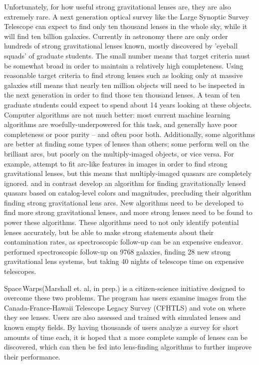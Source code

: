 \documentclass[10pt,twocolumn,letterpaper]{article}
\begin{document}
Unfortunately, for how useful strong gravitational lenses are, they are also
extremely rare. A next generation optical survey like the Large Synoptic Survey
Telescope can expect to find only ten thousand lenses in the whole sky, while
it will find ten billion galaxies. Currently in astronomy there are only order
hundreds of strong gravitational lenses known, mostly discovered by 'eyeball
squads' of graduate students. The small number means that target criteria must
be somewhat broad in order to maintain a relatively high completeness. Using
reasonable target criteria to find strong lenses such as looking only at
massive galaxies still means that nearly ten million objects will need to be
inspected in the next generation in order to find those ten thousand lenses. A
team of ten graduate students could expect to spend about 14 years looking at
these objects. Computer algorithms are not much better: most current machine
learning algorithms are woefully-underpowered for this task, and generally have
poor completeness or poor purity -- and often poor both. Additionally, some
algorithms are better at finding some types of lenses than others; some perform
well on the brilliant arcs, but poorly on the multiply-imaged objects, or vice
versa. For example, \cite{Kubo:2008aa} attempt to fit arc-like features in
images in order to find strong gravitational lenses, but this means that
multiply-imaged quasars are completely ignored. \cite{Agnello:2015aa} and
\cite{Chan:2014aa} in contrast develop an algorithm for finding gravitationally
lensed quasars based on catalog-level colors and magnitudes, precluding their
algorithm finding strong gravitational lens arcs. New algorithms need to be
developed to find more strong gravitational lenses, and more strong lenses need
to be found to power these algorithms. These algorithms need to not only
identify potential lenses accurately, but be able to make strong statements
about their contamination rates, as spectroscopic follow-up can be an expensive
endeavor. \cite{Momcheva:2015aa} performed spectroscopic follow-up on 9768
galaxies, finding 28 new strong gravitational lens systems, but taking 40
nights of telescope time on expensive telescopes.

{\sc Space\,Warps}\xspace (Marshall et. al, in prep.) is a citizen-science
initiative designed to overcome these two problems. The program has users
examine images from the Canada-France-Hawaii Telescope Legacy Survey (CFHTLS)
and vote on where they see lenses. Users are also assessed and trained with
simulated lenses and known empty fields. By having thousands of users analyze a
survey for short amounts of time each, it is hoped that a more complete sample
of lenses can be discovered, which can then be fed into lens-finding algorithms
to further improve their performance.
\end{document}
